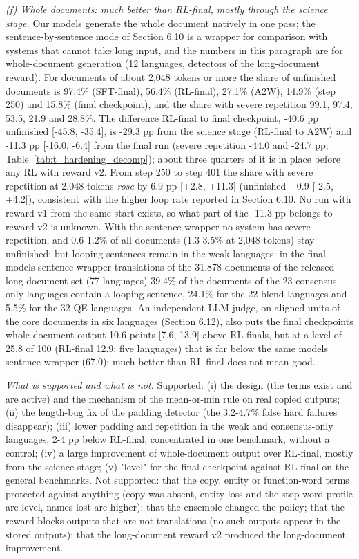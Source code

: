\emph{(f) Whole documents: much better than RL-final, mostly through the science stage.} Our models generate the whole document natively in one pass; the sentence-by-sentence mode of Section 6.10 is a wrapper for comparison with systems that cannot take long input, and the numbers in this paragraph are for whole-document generation (12 languages, detectors of the long-document reward). For documents of about 2,048 tokens or more the share of unfinished documents is 97.4\% (SFT-final), 56.4\% (RL-final), 27.1\% (A2W), 14.9\% (step 250) and 15.8\% (final checkpoint), and the share with severe repetition 99.1, 97.4, 53.5, 21.9 and 28.8\%. The difference RL-final to final checkpoint, -40.6 pp unfinished {[}-45.8, -35.4{]}, is -29.3 pp from the science stage (RL-final to A2W) and -11.3 pp {[}-16.0, -6.4{]} from the final run (severe repetition -44.0 and -24.7 pp; Table~\ref{tab:t_hardening_decomp}); about three quarters of it is in place before any RL with reward v2. From step 250 to step 401 the share with severe repetition at 2,048 tokens \emph{rose} by 6.9 pp {[}+2.8, +11.3{]} (unfinished +0.9 {[}-2.5, +4.2{]}), consistent with the higher loop rate reported in Section 6.10. No run with reward v1 from the same start exists, so what part of the -11.3 pp belongs to reward v2 is unknown. With the sentence wrapper no system has severe repetition, and 0.6-1.2\% of all documents (1.3-3.5\% at 2,048 tokens) stay unfinished; but looping sentences remain in the weak languages: in the final model\textquotesingle s sentence-wrapper translations of the 31,878 documents of the released long-document set (77 languages) 39.4\% of the documents of the 23 consensus-only languages contain a looping sentence, 24.1\% for the 22 blend languages and 5.5\% for the 32 QE languages. An independent LLM judge, on aligned units of the core documents in six languages (Section 6.12), also puts the final checkpoint\textquotesingle s whole-document output 10.6 points {[}7.6, 13.9{]} above RL-final\textquotesingle s, but at a level of 25.8 of 100 (RL-final 12.9; five languages) that is far below the same model\textquotesingle s sentence wrapper (67.0): \textquotesingle much better than RL-final\textquotesingle{} does not mean \textquotesingle good\textquotesingle.

\emph{What is supported and what is not.} Supported: (i) the design (the terms exist and are active) and the mechanism of the mean-or-min rule on real copied outputs; (ii) the length-bug fix of the padding detector (the 3.2-4.7\% false hard failures disappear); (iii) lower padding and repetition in the weak and consensus-only languages, 2-4 pp below RL-final, concentrated in one benchmark, without a control; (iv) a large improvement of whole-document output over RL-final, mostly from the science stage; (v) "level" for the final checkpoint against RL-final on the general benchmarks. Not supported: that the copy, entity or function-word terms protected against anything (copy was absent, entity loss and the stop-word profile are level, names lost are higher); that the ensemble changed the policy; that the reward blocks outputs that are not translations (no such outputs appear in the stored outputs); that the long-document reward v2 produced the long-document improvement.

